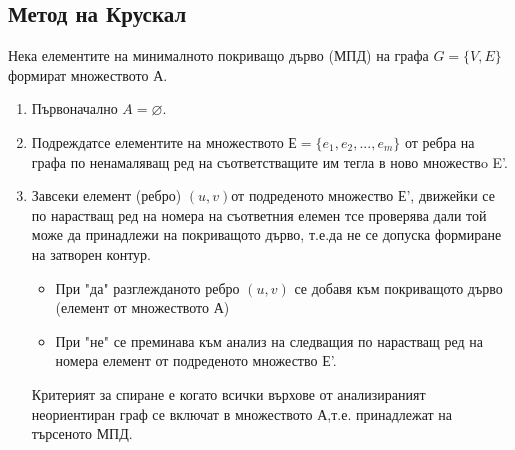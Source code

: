 \documentclass[fleqn, 12pt]{article}
\theoremstyle{definition}
\begin{document}
\subsection{Метод на Крускал}
Нека елементите на минималното покриващо дърво (МПД) на графа $G=\{V,E\}$ формират множеството А.
\begin{enumerate}
\item Първоначално $A = \varnothing$.
\item Подреждатсе елементите на множеството $Е=\{e_1,e_2, ... ,e_m\}$ от ребра на графа по ненамаляващ ред на съответстващите им тегла в ново множествo E'.
\item Завсеки  елемент   (ребро) $(u,v)$от подреденото множество Е’, движейки се по нарастващ ред на номера на съответния елемен тсе проверява дали той може да принадлежи на покриващото дърво, т.е.да не се допуска   формиране на затворен контур. 
\begin{itemize}
\item При  "да"  разглежданото ребро $(u,v)$ се добавя към покриващото дърво (елемент от множеството А)
\item При  "не"  се преминава към анализ на следващия по нарастващ ред на номера елемент от подреденото множество Е’.
\end{itemize}
Критерият за спиране е когато всички върхове от анализираният неориентиран граф се включат в множеството А,т.е. принадлежат на търсеното МПД.
\end{enumerate}
\end{document}
